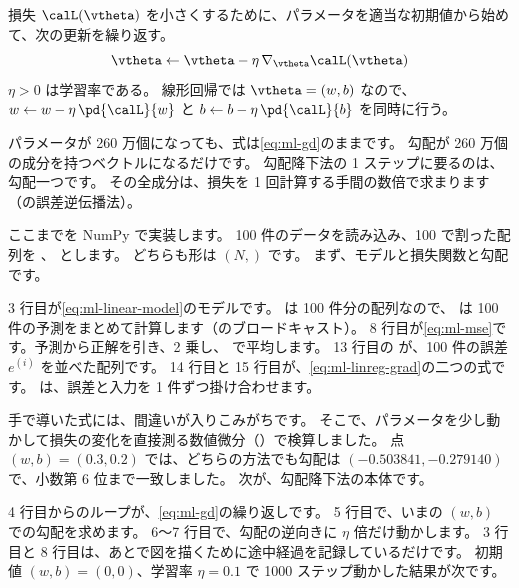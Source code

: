 \begin{definition}[勾配降下法]\label{def:ml-gd}
損失 $\calL(\vtheta)$ を小さくするために、パラメータを適当な初期値から始めて、次の更新を繰り返す。
\begin{equation}
\vtheta \leftarrow \vtheta - \eta\,\nabla_{\vtheta}\calL(\vtheta)
\label{eq:ml-gd}
\end{equation}
$\eta > 0$ は学習率である。
線形回帰では $\vtheta=(w,b)$ なので、
$w \leftarrow w - \eta\,\pd{\calL}{w}$ と $b \leftarrow b - \eta\,\pd{\calL}{b}$ を同時に行う。
\end{definition}

パラメータが 260 万個になっても、式は\eqref{eq:ml-gd}のままです。
勾配が 260 万個の成分を持つベクトルになるだけです。
勾配降下法の 1 ステップに要るのは、勾配一つです。
その全成分は、損失を 1 回計算する手間の数倍で求まります（の誤差逆伝播法）。

ここまでを NumPy で実装します。
100 件のデータを読み込み、100 で割った配列を 、 とします。
どちらも形は $(N,)$ です。
まず、モデルと損失関数と勾配です。


3 行目が\eqref{eq:ml-linear-model}のモデルです。
 は 100 件分の配列なので、 は 100 件の予測をまとめて計算します（のブロードキャスト）。
8 行目が\eqref{eq:ml-mse}です。予測から正解を引き、2 乗し、 で平均します。
13 行目の  が、100 件の誤差 $e^{(i)}$ を並べた配列です。
14 行目と 15 行目が、\eqref{eq:ml-linreg-grad}の二つの式です。
 は、誤差と入力を 1 件ずつ掛け合わせます。

手で導いた式には、間違いが入りこみがちです。
そこで、パラメータを少し動かして損失の変化を直接測る数値微分（）で検算しました。
点 $(w,b)=(0.3, 0.2)$ では、どちらの方法でも勾配は $(-0.503841, -0.279140)$ で、小数第 6 位まで一致しました。
次が、勾配降下法の本体です。


4 行目からのループが、\eqref{eq:ml-gd}の繰り返しです。
5 行目で、いまの $(w,b)$ での勾配を求めます。
6〜7 行目で、勾配の逆向きに $\eta$ 倍だけ動かします。
3 行目と 8 行目は、あとで図を描くために途中経過を記録しているだけです。
初期値 $(w,b)=(0,0)$、学習率 $\eta=0.1$ で 1000 ステップ動かした結果が次です。


